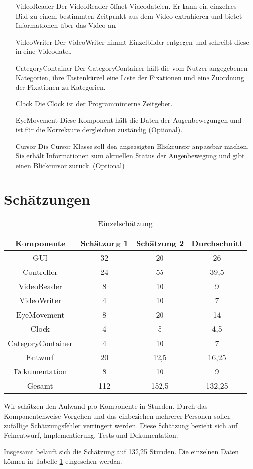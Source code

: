 \documentclass[a4paper]{scrartcl}
\begin{document}
\begin{enumerate}
  \item[VideoReader] Der VideoReader öffnet Videodateien. Er kann ein einzelnes Bild zu einem bestimmten Zeitpunkt aus dem Video extrahieren und bietet Informationen über das Video an.
  \item[VideoWriter] Der VideoWriter nimmt Einzelbilder entgegen und schreibt diese in eine Videodatei.
  \item[CategoryContainer] Der CategoryContainer hält die vom Nutzer angegebenen Kategorien, ihre Tastenkürzel eine Liste der Fixationen und eine Zuordnung der Fixationen zu Kategorien.
  \item[Clock] Die Clock ist der Programminterne Zeitgeber.
  \item[EyeMovement] Diese Komponent hält die Daten der Augenbewegungen und ist für die Korrekture dergleichen zuständig (Optional).
  \item[Cursor] Die Cursor Klasse soll den angezeigten Blickcursor anpassbar machen. Sie erhält Informationen zum aktuellen Status der Augenbewegung und gibt einen Blickcursor zurück. (Optional)
\end{enumerate}


\section{Schätzungen}
  \begin{table}[!ht]
  \begin{center}
  \begin{tabular}{c|c|c|c}
    Komponente & Schätzung 1 & Schätzung 2 & Durchschnitt \\
    \hline
    GUI & 32 & 20 & 26\\
    Controller & 24 & 55 & 39,5\\
    VideoReader & 8 & 10 & 9\\
    VideoWriter & 4 & 10 & 7\\
    EyeMovement & 8 & 20 & 14\\
    Clock & 4 & 5 & 4,5\\
    CategoryContainer & 4 & 10 & 7\\
    \hline
    Entwurf & 20 & 12,5 & 16,25\\
    Dokumentation & 8 & 10 & 9\\
    Gesamt & 112 & 152,5 & 132,25\\
  \end{tabular}
  \caption{Einzelschätzung}
  \label{Einzelschaetzung}
  \end{center}
  \end{table}

  Wir schätzen den Aufwand pro Komponente in Stunden. Durch das Komponentenweise Vorgehen und das einbeziehen mehrerer Personen sollen zufällige Schätzungsfehler verringert werden. Diese Schätzung bezieht sich auf Feinentwurf, Implementierung, Tests und Dokumentation.

  Insgesamt beläuft sich die Schätzung auf 132,25 Stunden. Die einzelnen Daten können in Tabelle \ref{Einzelschaetzung} eingesehen werden.
\end{document}
